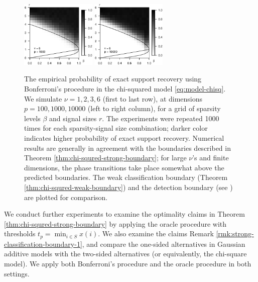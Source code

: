 \begin{figure}
      \includegraphics[width=0.32\textwidth]{./sim_strong_boundary/simulated_phase_diagram_chi-squared_nu6_p1000.eps}
      \includegraphics[width=0.32\textwidth]{./sim_strong_boundary/simulated_phase_diagram_chi-squared_nu6_p10000.eps}
      \caption{The empirical probability of exact support recovery using Bonferroni's procedure in the chi-squared model \eqref{eq:model-chisq}. 
      We simulate $\nu=1, 2, 3, 6$ (first to last row), at dimensions $p=100, 1000, 10000$ (left to right column), for a grid of sparsity levels $\beta$ and signal sizes $r$.
      The experiments were repeated 1000 times for each sparsity-signal size combination; darker color indicates higher probability of exact support recovery.  
      Numerical results are generally in agreement with the boundaries described in Theorem \ref{thm:chi-squred-strong-boundary}; for large $\nu$'s and finite dimensions, the phase transitions take place somewhat above the predicted boundaries.
      The weak classification boundary (Theorem \ref{thm:chi-squred-weak-boundary}) and the detection boundary (see \citep{donoho2004higher}) are plotted for comparison.} 
      \label{fig:phase-simulated-chi-squared}
\end{figure}

We conduct further experiments to examine the optimality claims in Theorem \ref{thm:chi-squred-strong-boundary} by applying the oracle procedure with thresholds $t_p=\min_{i\in S}x(i)$.
We also examine the claims Remark \ref{rmk:strong-classification-boundary-1}, and compare the one-sided alternatives in Gaussian additive models with the two-sided alternatives (or equivalently, the chi-square model).
We apply both Bonferroni's procedure and the oracle procedure in both settings.

